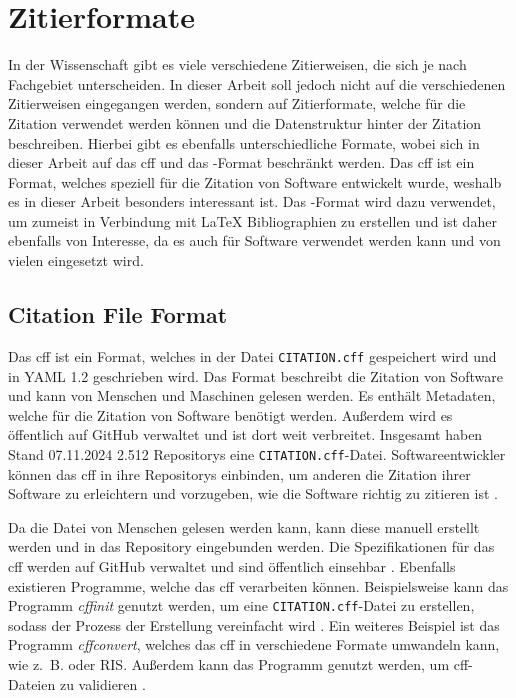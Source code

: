 \section{Zitierformate}
\label{sec:zitierformate}
In der Wissenschaft gibt es viele verschiedene Zitierweisen, die sich je nach Fachgebiet unterscheiden.
In dieser Arbeit soll jedoch nicht auf die verschiedenen Zitierweisen eingegangen werden, sondern auf Zitierformate, welche für die Zitation verwendet werden können und die Datenstruktur hinter der Zitation beschreiben.
Hierbei gibt es ebenfalls unterschiedliche Formate, wobei sich in dieser Arbeit auf das \gls{cff} und das -Format beschränkt werden.
Das \gls{cff} ist ein Format, welches speziell für die Zitation von Software entwickelt wurde, weshalb es in dieser Arbeit besonders interessant ist.
Das -Format wird dazu verwendet, um zumeist in Verbindung mit \LaTeX{} Bibliographien zu erstellen und ist daher ebenfalls von Interesse, da es auch für Software verwendet werden kann und von vielen eingesetzt wird.

\subsection{Citation File Format}
\label{subsec:citation-file-format}
Das \gls{cff} ist ein Format, welches in der Datei \texttt{CITATION.cff} gespeichert wird und in YAML 1.2 geschrieben wird. 
Das Format beschreibt die Zitation von Software und kann von Menschen und Maschinen gelesen werden.
Es enthält Metadaten, welche für die Zitation von Software benötigt werden.
Außerdem wird es öffentlich auf GitHub verwaltet und ist dort weit verbreitet.
Insgesamt haben Stand 07.11.2024 2.512 Repositorys eine \texttt{CITATION.cff}-Datei.
Softwareentwickler können das \gls{cff} in ihre Repositorys einbinden, um anderen die Zitation ihrer Software zu erleichtern und vorzugeben, wie die Software richtig zu zitieren ist \autocite{druskat_citation_2021}.

Da die Datei von Menschen gelesen werden kann, kann diese manuell erstellt werden und in das Repository eingebunden werden.
Die Spezifikationen für das \gls{cff} werden auf GitHub verwaltet und sind öffentlich einsehbar \autocite{druskat_citation_2021}.
Ebenfalls existieren Programme, welche das \gls{cff} verarbeiten können.
Beispielsweise kann das Programm \emph{cffinit} genutzt werden, um eine \texttt{CITATION.cff}-Datei zu erstellen, sodass der Prozess der Erstellung vereinfacht wird \autocite{spaaks_cffinit_2023}.
Ein weiteres Beispiel ist das Programm \emph{cffconvert}, welches das \gls{cff} in verschiedene Formate umwandeln kann, wie z. B.  oder RIS.
Außerdem kann das Programm genutzt werden, um \gls{cff}-Dateien zu validieren \autocite{spaaks_cffconvert_2021}.

